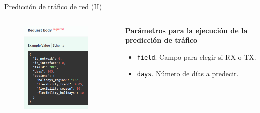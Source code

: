 \documentclass[aspectratio=169,xcolor=dvipsnames]{beamer}
\begin{document}
	\begin{frame}{Predicción de tráfico de red (II)}
		\begin{columns}
			\begin{column}{0.4\textwidth}
				\begin{figure}[h!]
					\begin{center}
						\includegraphics[width=0.9\textwidth]{img/parameters_post_forecast.png}
					\end{center}
				\end{figure}
			\end{column}
		
			\begin{column}{0.6\textwidth}
				\textbf{Parámetros para la ejecución de la predicción de tráfico}
				
				\begin{itemize}
					\item \texttt{field}. Campo para elegir si RX o TX.
					
					\item \texttt{days}. Número de días a predecir.
					

\end{itemize}
\end{column}
\end{columns}
\end{frame}
\end{document}
